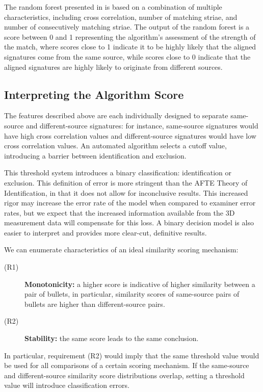 \documentclass[doubleblind]{elsarticle}\usepackage[]{graphicx}\usepackage[]{color}
\begin{document}
The random forest presented in \citet{aoas2} is based on a combination of multiple characteristics, including cross correlation, number of matching striae, and number of consecutively matching striae. The output of the random forest is a score between 0 and 1 representing the algorithm's assessment of the strength of the match, where scores close to 1 indicate it to be highly likely that the aligned signatures come from the same source, while scores close to 0 indicate that the aligned signatures are highly likely to originate from different sources.

\subsection{Interpreting the Algorithm Score}

The features described above are each individually designed to separate same-source and different-source signatures: for instance, same-source signatures would have high cross correlation values and different-source signatures would have low cross correlation values. An automated algorithm selects a cutoff value, introducing a barrier between identification and exclusion.

This threshold system introduces a binary classification: identification or exclusion. This definition of error is more stringent than the AFTE Theory of Identification, in that it does not allow for inconclusive results. This increased rigor may increase the error rate of the model when compared to examiner error rates, but we expect that the increased information available from the 3D measurement data will compensate for this loss. A binary decision model is also easier to interpret and provides more clear-cut, definitive results.

We can enumerate characteristics of an ideal similarity scoring mechanism: 
\begin{description}
\item[(R1)] {\bf Monotonicity:} a higher score is indicative of higher similarity between a pair of bullets, in particular, similarity scores of same-source pairs of bullets are higher than different-source pairs.
\item[(R2)] {\bf Stability:} the same score leads to the same conclusion. 
\end{description}

In particular, requirement (R2) would imply that the same threshold value would be used for all comparisons of a certain scoring mechanism. If the same-source and different-source similarity score distributions overlap, setting a threshold value will introduce classification errors.
\end{document}
